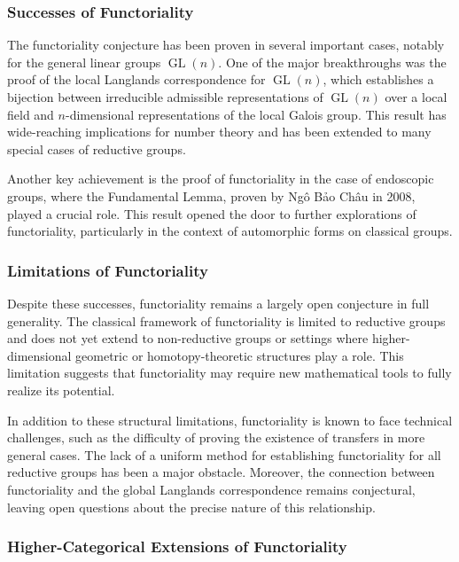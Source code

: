 \documentclass{article}
\theoremstyle{remark}
\begin{document}
\subsubsection{Successes of Functoriality}

The functoriality conjecture has been proven in several important cases, notably for the general linear groups $\operatorname{GL}(n)$. One of the major breakthroughs was the proof of the local Langlands correspondence for $\operatorname{GL}(n)$, which establishes a bijection between irreducible admissible representations of $\operatorname{GL}(n)$ over a local field and $n$-dimensional representations of the local Galois group. This result has wide-reaching implications for number theory and has been extended to many special cases of reductive groups.

Another key achievement is the proof of functoriality in the case of endoscopic groups, where the Fundamental Lemma, proven by Ngô Bảo Châu in 2008, played a crucial role. This result opened the door to further explorations of functoriality, particularly in the context of automorphic forms on classical groups.

\subsubsection{Limitations of Functoriality}

Despite these successes, functoriality remains a largely open conjecture in full generality. The classical framework of functoriality is limited to reductive groups and does not yet extend to non-reductive groups or settings where higher-dimensional geometric or homotopy-theoretic structures play a role. This limitation suggests that functoriality may require new mathematical tools to fully realize its potential.

In addition to these structural limitations, functoriality is known to face technical challenges, such as the difficulty of proving the existence of transfers in more general cases. The lack of a uniform method for establishing functoriality for all reductive groups has been a major obstacle. Moreover, the connection between functoriality and the global Langlands correspondence remains conjectural, leaving open questions about the precise nature of this relationship.

\subsubsection{Higher-Categorical Extensions of Functoriality}
\end{document}
